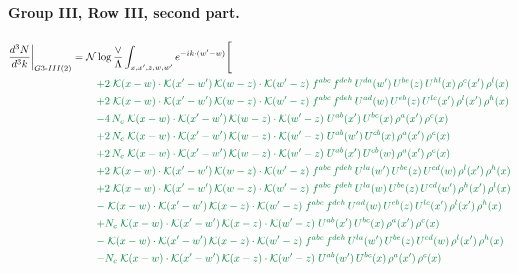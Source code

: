 \documentclass[10pt]{article}
\numberwithin{equation}{section}
\newcommand{\NN}{\mathcal N\log\frac{\vee}{\Lambda}}
\begin{document}
\paragraph{Group III, Row III, second part.}
\begin{align}
\frac{d^3N}{d^3k}\bigg|_{G3\text{-}III(2)}={}&\NN\int_{x,x',z,w,w'}e^{-ik\cdot(w'-w)}\Bigg[\notag\\
&\quad{\color{JIM}+2\;\mathcal{K}(x-w)\cdot\mathcal{K}(x'-w')\,\mathcal{K}(w-z)\cdot\mathcal{K}(w'-z)\;f^{abc}\,f^{deh}\,U^{da}(w')\,U^{be}(z)\,U^{hl}(x)\,\rho^{c}(x')\,\rho^{l}(x)}\notag\\
&\quad{\color{JIM}+2\;\mathcal{K}(x-w)\cdot\mathcal{K}(x'-w')\,\mathcal{K}(w-z)\cdot\mathcal{K}(w'-z)\;f^{abc}\,f^{deh}\,U^{ad}(w)\,U^{eb}(z)\,U^{lc}(x')\,\rho^{l}(x')\,\rho^{h}(x)}\notag\\
&\quad{\color{JIM}-4\,N_c\;\mathcal{K}(x-w)\cdot\mathcal{K}(x'-w')\,\mathcal{K}(w-z)\cdot\mathcal{K}(w'-z)\;U^{ab}(x')\,U^{bc}(x)\,\rho^{a}(x')\,\rho^{c}(x)}\notag\\
&\quad{\color{JIM}+2\,N_c\;\mathcal{K}(x-w)\cdot\mathcal{K}(x'-w')\,\mathcal{K}(w-z)\cdot\mathcal{K}(w'-z)\;U^{ab}(w')\,U^{cb}(x)\,\rho^{a}(x')\,\rho^{c}(x)}\notag\\
&\quad{\color{JIM}+2\,N_c\;\mathcal{K}(x-w)\cdot\mathcal{K}(x'-w')\,\mathcal{K}(w-z)\cdot\mathcal{K}(w'-z)\;U^{ab}(x')\,U^{cb}(w)\,\rho^{a}(x')\,\rho^{c}(x)}\notag\\
&\quad{\color{JIM}+2\;\mathcal{K}(x-w)\cdot\mathcal{K}(x'-w')\,\mathcal{K}(w-z)\cdot\mathcal{K}(w'-z)\;f^{abc}\,f^{deh}\,U^{la}(w')\,U^{be}(z)\,U^{cd}(w)\,\rho^{l}(x')\,\rho^{h}(x)}\notag\\
&\quad{\color{JIM}+2\;\mathcal{K}(x-w)\cdot\mathcal{K}(x'-w')\,\mathcal{K}(w-z)\cdot\mathcal{K}(w'-z)\;f^{abc}\,f^{deh}\,U^{la}(w)\,U^{be}(z)\,U^{cd}(w')\,\rho^{h}(x')\,\rho^{l}(x)}\notag\\
&\quad{\color{JIM}-\;\mathcal{K}(x-w)\cdot\mathcal{K}(x'-w')\,\mathcal{K}(x-z)\cdot\mathcal{K}(w'-z)\;f^{abc}\,f^{deh}\,U^{ad}(w)\,U^{eb}(z)\,U^{lc}(x')\,\rho^{l}(x')\,\rho^{h}(x)}\notag\\
&\quad{\color{JIM}+N_c\;\mathcal{K}(x-w)\cdot\mathcal{K}(x'-w')\,\mathcal{K}(x-z)\cdot\mathcal{K}(w'-z)\;U^{ab}(x')\,U^{bc}(x)\,\rho^{a}(x')\,\rho^{c}(x)}\notag\\
&\quad{\color{JIM}-\;\mathcal{K}(x-w)\cdot\mathcal{K}(x'-w')\,\mathcal{K}(x-z)\cdot\mathcal{K}(w'-z)\;f^{abc}\,f^{deh}\,U^{la}(w')\,U^{be}(z)\,U^{cd}(w)\,\rho^{l}(x')\,\rho^{h}(x)}\notag\\
&\quad{\color{JIM}-N_c\;\mathcal{K}(x-w)\cdot\mathcal{K}(x'-w')\,\mathcal{K}(x-z)\cdot\mathcal{K}(w'-z)\;U^{ab}(w')\,U^{bc}(x)\,\rho^{a}(x')\,\rho^{c}(x)}\notag\\

\end{align}
\end{document}

